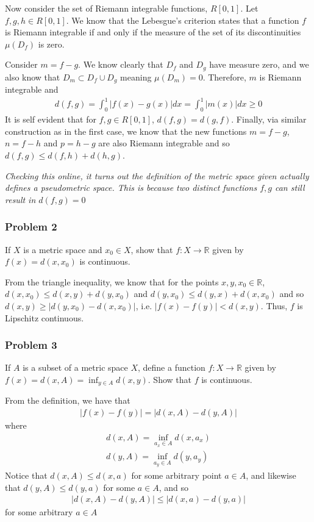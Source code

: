 \documentclass{article}
\newcommand{\R}{\mathbb{R}}
\begin{document}
	Now consider the set of Riemann integrable functions, $R[0, 1]$. Let $f, g, h \in R[0, 1]$. We know that the Lebesgue’s criterion states that a function $f$ is Riemann integrable if and only if the measure of the set of its discontinuities $\mu(D_f)$ is zero.

	Consider $m = f - g$. We know clearly that $D_f$ and $D_g$ have measure zero, and we also know that $D_m \subset D_f \cup D_g$ meaning $\mu(D_m) = 0$. Therefore, $m$ is Riemann integrable and
	\begin{gather*}
		d(f, g) = \int_0^1 |f(x) - g(x)| dx = \int_0^1 |m(x)| dx \geq 0
	\end{gather*}
	It is self evident that for $f, g \in R[0, 1]$, $d(f, g) = d(g, f)$. Finally, via similar construction as in the first case, we know that the new functions $m = f - g$, $n = f - h$ and $p = h - g$ are also Riemann integrable and so $d(f, g) \leq d(f, h) + d(h, g)$.
	
	\textit{Checking this online, it turns out the definition of the metric space given actually defines a pseudometric space. This is because two distinct functions $f, g$ can still result in $d(f, g) = 0$}
	
	\subsubsection*{Problem 2}
	If $X$ is a metric space and $x_0 \in X$, show that $f: X \to \R$ given by $f(x) = d(x, x_0)$ is continuous.
	
	From the triangle inequality, we know that for the points $x, y, x_0 \in \R$, $d(x, x_0) \leq d(x, y) + d(y, x_0)$ and $d(y, x_0) \leq d(y, x) + d(x, x_0)$ and so $d(x, y) \geq |d(y, x_0) - d(x, x_0)|$, i.e. $|f(x) - f(y)| < d(x, y)$. Thus, $f$ is Lipschitz continuous.
	
	\subsubsection*{Problem 3}
	If $A$ is a subset of a metric space $X$, define a function $f : X \to \R$ given by $f(x) = d(x, A) = \inf_{y \in A} d(x, y)$. Show that $f$ is continuous.
	
	From the definition, we have that
	\begin{gather*}
		|f(x) - f(y)| = |d(x, A) - d(y, A)|
	\end{gather*}
	where
	\begin{gather*}
		d(x, A) = \inf_{a_x \in A} d(x, a_x) \\
		d(y, A) = \inf_{a_y \in A} d(y, a_y)
	\end{gather*}
	Notice that $d(x, A) \leq d(x, a)$ for some arbitrary point $a \in A$, and likewise that $d(y, A) \leq d(y, a)$ for some $a \in A$, and so 
	\begin{gather*}
		|d(x, A) - d(y, A)| \leq |d(x, a) - d(y, a)|
	\end{gather*}
	for some arbitrary $a \in A$
	
\end{document}
